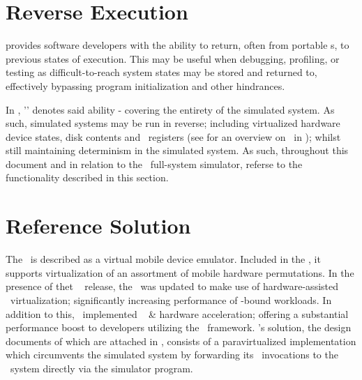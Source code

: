 \section*{Reverse Execution}
\label{sec:appendixa_reverseexecution}

 provides software developers with the ability to return, often from portable \dvttermcheckpoint s, to previous states of execution.
This may be useful when debugging, profiling, or testing as difficult-to-reach system states may be stored and returned to, effectively bypassing program initialization and other hindrances.

In \dvttermsimics , '\dvttermreverseexecution ' denotes said ability - covering the entirety of the simulated system.
As such, simulated systems may be run in reverse; including virtualized hardware device states, disk contents and \dvttermcpu\ registers (see  for an overview on \dvttermreverseexecution\ in \dvttermsimics ); whilst still maintaining determinism in the simulated system.
As such, throughout this document and in relation to the \dvttermsimics\ full-system simulator, \dvttermreverseexecution referse to the functionality described in this section.

\section*{Reference Solution}
\label{sec:appendixa_referencesolution}

The \dvttermandroidemulator\ is described as a virtual mobile device emulator. Included in the \dvttermandroidsdk , it supports virtualization of an assortment of mobile hardware permutations.
In the presence of thet \dvttermandroid\  release, the \dvttermandroidsdk\ was updated to make use of hardware-assisted \dvttermxeightysix\ virtualization; significantly increasing performance of \dvttermcpu -bound workloads.
In addition to this, \dvttermgoogle\ implemented \dvttermopengles\  \&  hardware acceleration; offering a substantial performance boost to developers utilizing the \dvttermopengles\ framework.
\dvttermgoogle 's solution, the design documents of which are attached in , consists of a paravirtualized implementation which circumvents the simulated system by forwarding its \dvttermopengles\ invocations to the \dvttermhost\ system directly via the simulator program.

